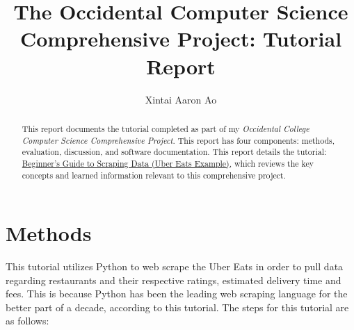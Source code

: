 \documentclass[10pt,twocolumn]{article}
\title{The Occidental Computer Science Comprehensive Project: Tutorial Report}
\author{Xintai Aaron Ao}
\affiliation{Occidental College}
\begin{document}
\maketitle

\begin{abstract}

This report documents the tutorial completed as part of my \textit{Occidental College Computer Science Comprehensive Project}. This report has four components: methods, evaluation, discussion, and software documentation. This report details the tutorial: \href{https://benminor.medium.com/beginners-guide-to-scraping-data-uber-eats-example-dca0b872be4e}{Beginner’s Guide to Scraping Data (Uber Eats Example)}, which reviews the key concepts and learned information relevant to this comprehensive project.

\end{abstract}

\section{Methods}
This tutorial utilizes Python to web scrape the Uber Eats in order to pull data regarding restaurants and their respective ratings, estimated delivery time and fees. This is because Python has been the leading web scraping language for the better part of a decade, according to this tutorial. The steps for this tutorial are as follows:
\end{document}
